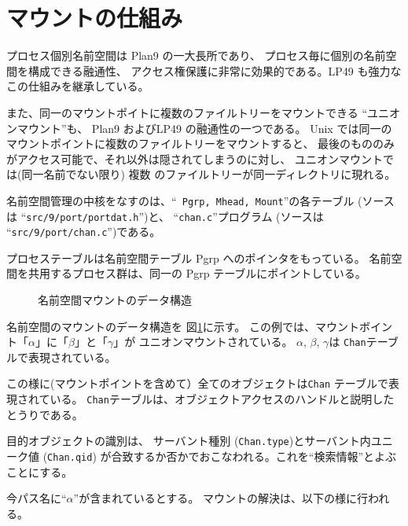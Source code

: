 \section{マウントの仕組み}

    プロセス個別名前空間は Plan9 の一大長所であり、
プロセス毎に個別の名前空間を構成できる融通性、
アクセス権保護に非常に効果的である。LP49 も強力なこの仕組みを継承している。

    また、同一のマウントポイトに複数のファイルトリーをマウントできる
``ユニオンマウント''も、  Plan9 およびLP49 の融通性の一つである。
  Unix では同一のマウントポイントに複数のファイルトリーをマウントすると、
最後のもののみがアクセス可能で、それ以外は隠されてしまうのに対し、
  ユニオンマウントでは(同一名前でない限り) 複数
  のファイルトリーが同一ディレクトリに現れる。


名前空間管理の中核をなすのは、``\verb| Pgrp, Mhead, Mount|''の各テーブル
(ソースは ``\verb|src/9/port/portdat.h|'')と、
``\verb|chan.c|''プログラム (ソースは ``\verb|src/9/port/chan.c|'')である。

プロセステーブルは名前空間テーブル Pgrp へのポインタをもっている。
 名前空間を共用するプロセス群は、同一の Pgrp テーブルにポイントしている。


\begin{figure}[hbt]
  \begin{center}
   \epsfxsize=440pt
    \caption{名前空間マウントのデータ構造}
    \label{fig:MountStruct}
  \end{center}
\end{figure}

名前空間のマウントのデータ構造を
図\ref{fig:MountStruct}に示す。
この例では、マウントボイント「$\alpha$」に「$\beta$」と「$\gamma$」が
ユニオンマウントされている。
$\alpha$, $\beta$, $\gamma$は {\tt Chan}テーブルで表現されている。

この様に(マウントポイントを含めて）全てのオブジェクトは{\tt Chan}
テーブルで表現されている。
{\tt Chan}テーブルは、オブジェクトアクセスのハンドルと説明したとうりである。

目的オブジェクトの識別は、
サーバント種別 ({\tt Chan.type})とサーバント内ユニーク値 ({\tt Chan.qid})
が合致するか否かでおこなわれる。これを``検索情報''とよぶことにする。

今パス名に``$\alpha$''が含まれているとする。
マウントの解決は、以下の様に行われる。

